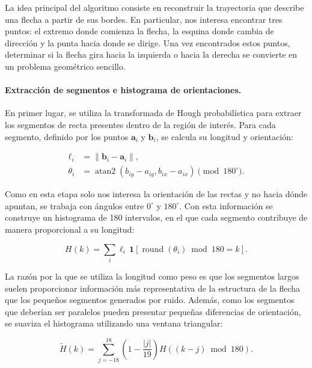 \documentclass[11pt,a4paper]{article}
\begin{document}
La idea principal del algoritmo consiste en reconstruir la trayectoria que describe una flecha a partir de sus bordes. En particular, nos interesa encontrar tres puntos: el extremo donde comienza la flecha, la esquina donde cambia de dirección y la punta hacia donde se dirige. Una vez encontrados estos puntos, determinar si la flecha gira hacia la izquierda o hacia la derecha se convierte en un problema geométrico sencillo.


\paragraph{Extracción de segmentos e histograma de orientaciones.}

En primer lugar, se utiliza la transformada de Hough probabilística para extraer los segmentos de recta presentes dentro de la región de interés. Para cada segmento, definido por los puntos $\mathbf a_i$ y $\mathbf b_i$, se calcula su longitud y orientación:

\begin{align}
    \ell_i &= \|\mathbf b_i-\mathbf a_i\|,\\
    \theta_i &=
    \operatorname{atan2}(b_{iy}-a_{iy},b_{ix}-a_{ix})
    \pmod{180^\circ}.
\end{align}

Como en esta etapa solo nos interesa la orientación de las rectas y no hacia dónde apuntan, se trabaja con ángulos entre $0^\circ$ y $180^\circ$. Con esta información se construye un histograma de 180 intervalos, en el que cada segmento contribuye de manera proporcional a su longitud:

\begin{equation}
    H(k)=\sum_i \ell_i\,
    \mathbf 1[
    \operatorname{round}(\theta_i)\bmod180=k
    ].
\end{equation}

La razón por la que se utiliza la longitud como peso es que los segmentos largos suelen proporcionar información más representativa de la estructura de la flecha que los pequeños segmentos generados por ruido. Además, como los segmentos que deberían ser paralelos pueden presentar pequeñas diferencias de orientación, se suaviza el histograma utilizando una ventana triangular:

\begin{equation}
    \widetilde H(k)=
    \sum_{j=-18}^{18}
    \left(1-\frac{|j|}{19}\right)
    H((k-j)\bmod180).
\end{equation}
\end{document}

